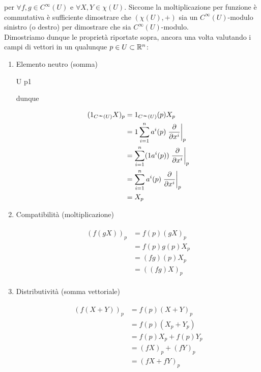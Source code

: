 per $ \forall f,g \in C^{\infty}(U) $ e $ \forall X,Y \in \chi(U) $. Siccome la moltiplicazione per funzione è commutativa è sufficiente dimostrare che $ (\chi(U),+) $ sia un $ C^{\infty}(U) $-modulo sinistro (o destro) per dimostrare che sia $ C^{\infty}(U) $-modulo.\\
Dimostriamo dunque le proprietà riportate sopra, ancora una volta valutando i campi di vettori in un qualunque $ p \in U \subset \mathbb{R}^{n} $:

\begin{enumerate}
	\item Elemento neutro (somma)
	
			{U}{\R}
			{p}{1}
			
		dunque
			
		\begin{align}
			\begin{split}
				(1_{C^{\infty}(U)} X)_{p} &= 1_{C^{\infty}(U)} (p) X_{p}\\
				&= 1 \sum_{i=1}^{n} a^{i} (p) \eval{ \pdv{x^{i}} }_{p}\\
				&= \sum_{i=1}^{n} (1 a^{i} (p)) \eval{ \pdv{x^{i}} }_{p}\\
				&= \sum_{i=1}^{n} a^{i} (p) \eval{ \pdv{x^{i}} }_{p}\\
				&= X_{p}
			\end{split}
		\end{align}
	
	\item Compatibilità (moltiplicazione)
	
		\begin{align}
			\begin{split}
				(f (g X))_{p} &= f (p) (g X)_{p}\\
				&= f (p) g (p) X_{p}\\
				&= (f g) (p) X_{p}\\
				&= ((f g) X)_{p}
			\end{split}
		\end{align}
	
	\item Distributività (somma vettoriale)
	
		\begin{align}
			\begin{split}
				(f (X + Y))_{p} &= f (p) (X + Y)_{p}\\
				&= f (p) (X_{p} + Y_{p})\\
				&= f (p) X_{p} + f (p) Y_{p}\\
				&= (f X)_{p} + (f Y)_{p}\\
				&= (f X + f Y)_{p}
			\end{split}
		\end{align}
	

\end{enumerate}
